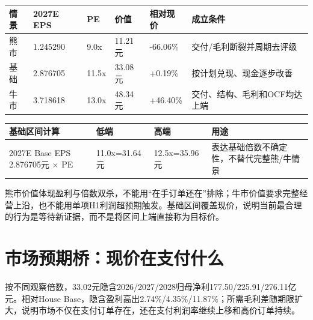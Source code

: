 \begin{exhibitbox}[三情景与公允价值]
\small
\begin{tabularx}{\exhibitboxwidth}{L{2.2cm}R{2.2cm}R{2.0cm}R{2.5cm}R{2.4cm}X}
\toprule
\textbf{情景} & \textbf{2027E EPS} & \textbf{PE} & \textbf{价值} & \textbf{相对现价} & \textbf{成立条件} \\
\midrule
熊市 & 1.245290 & 9.0x & 11.21元 & -66.06\% & 交付/毛利断裂并周期去评级 \\
 基础 & 2.876705 & 11.5x & 33.08元 & +0.19\% & 按计划兑现、现金逐步改善 \\
牛市 & 3.718618 & 13.0x & 48.34元 & +46.40\% & 交付、结构、毛利和OCF均达上端 \\
\bottomrule
\end{tabularx}
\vspace{0.35em}
\begin{tabularx}{\exhibitboxwidth}{L{4.2cm}R{3.0cm}R{3.0cm}X}
\toprule
\textbf{基础区间计算} & \textbf{低端} & \textbf{高端} & \textbf{用途} \\
\midrule
2027E Base EPS 2.876705元 \(\times\) PE & 11.0x=31.64元 & 12.5x=35.96元 & 表达基础倍数不确定性，不替代完整熊/牛情景 \\
\bottomrule
\end{tabularx}
\end{exhibitbox}

熊市价值体现盈利与倍数双杀，不能用“在手订单还在”排除；牛市价值要求完整经营上沿，也不能用单项H1利润超预期触发。基础区间覆盖现价，说明当前最合理的行为是等待新证据，而不是将区间上端直接称为目标价。

\section{市场预期桥：现价在支付什么}

按不同观察倍数，33.02元隐含2026/2027/2028归母净利177.50/225.91/276.11亿元。相对House Base，隐含盈利高出2.74\%/4.35\%/11.87\%；所需毛利差随期限扩大，说明市场不仅在支付订单存在，还在支付利润率继续上移和高价订单持续。

